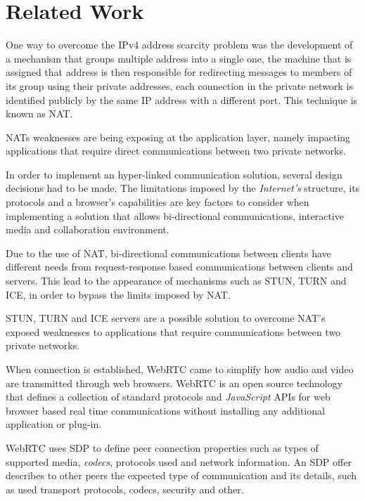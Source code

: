\documentclass[conference,compsoc,a4paper]{IEEEtran}
\begin{document}
\section{Related Work}
\label{chapter:relatedwork}

One way to overcome the \gls{IPv4} address scarcity problem \cite{ipv4} was the development of a mechanism that groups multiple address into a single one, the machine that is assigned that address is then responsible for redirecting messages to members of its group using their private addresses, each connection in the private network is identified publicly by the same \gls{IP} address with a different port. This technique is known as \gls{NAT}\cite{rfc3489}.

\gls{NAT}s weaknesses are being exposing at the application layer, namely impacting applications that require direct communications between two private networks.

In order to implement an hyper-linked communication solution, several design decisions had to be made. The limitations imposed by the \emph{Internet's} structure, its protocols and a browser's capabilities are key factors to consider when implementing a solution that allows bi-directional communications, interactive media and collaboration environment.

Due to the use of \gls{NAT}, bi-directional communications between clients have different needs from request-response based communications between clients and servers.
This lead to the appearance of mechanisms such as \gls{STUN}, \gls{TURN} and \gls{ICE}, in order to bypass the limits imposed by \gls{NAT}.

\gls{STUN}, \gls{TURN} and \gls{ICE} \cite{natvoip} servers are a possible solution to overcome \gls{NAT}'s exposed weaknesses to applications that require communications between two private networks. 


When connection is established, \gls{WebRTC} came to simplify how audio and video are transmitted through web browsers. \gls{WebRTC} is an open source technology that defines a collection of standard protocols and \emph{JavaScript} \gls{API}s for web browser based real time communications without installing any additional application or plug-in. 

\gls{WebRTC} uses \gls{SDP} \cite{rfc4566} to define peer connection properties such as types of supported media, \emph{codecs}, protocols used and network information. An \gls{SDP} offer describes to other peers the expected type of communication and its details, such as used transport protocols, codecs, security and other.
\end{document}

